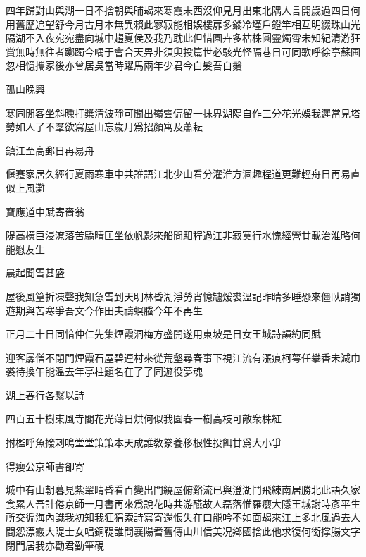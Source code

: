 \documentclass{zhvt-classic-Miya}
\begin{document}
四年歸對山與湖一日不捨朝與晡朅來寒霞未西沒仰見月出東北隅人言開歲過四日何用舊歷追望舒今月古月本無異賴此寥寂能相娛樓扉多鐍冷墐戶鐙竿相互明綴珠山光隔湖不入夜宛宛盡向城中趨夏侯及我乃耽此但惜園卉多枯株圓靈燭霄未知紀清游狂賞無時無往者躑躅今喁于會合天畀非須臾投篇世必駭光怪隔巷日可同歌呼徐亭蘇圃忽相憶攜家後亦曾居吳當時躍馬兩年少君今白髮吾白鬚

\begin{fw}孤山晚興\end{fw}

寒同閒客坐斜曛打槳清波靜可聞出嶺雲偏留一抹界湖隄自作三分花光娛我遲當見塔勢如人了不羣欲寫屋山忘歲月爲招顏寓及蕭耘

\begin{fw}鎮江至高郵日再易舟\end{fw}

偃蹇家居久經行夏雨寒車中共誰語江北少山看分灌淮方涸趣程道更難輕舟日再易直似上風灘

\begin{fw}寶應道中賦寄嗇翁\end{fw}

隄高橫巨浸潦落苦驕晴匡坐依帆影來船問馹程過江非寂寞行水愧經營廿載治淮略何能慰友生

\begin{fw}晨起聞雪甚盛\end{fw}

屋後風篁折凍聲我知急雪到天明林昏湖淨勞宵憶罏煖裘溫記昨晴多睡恐來僵臥誚獨遊期與苦寒爭吾文今作田夫禱螟螣今年不再生

\begin{fw}正月二十日同愔仲仁先集煙霞洞梅方盛開遂用東坡是日女王城詩韻約同賦\end{fw}

迎客孱僧不閉門煙霞石屋碧連村來從荒壑尋春事下視江流有漲痕柯萼任攀香未減巾裘待換午能溫去年亭柱題名在了了同遊役夢魂

\begin{fw}湖上春行各繫以詩\end{fw}

四百五十樹東風寺閣花光薄日烘何似我園春一樹高枝可敵衆株紅

拊檻呼魚撥剌鳴堂堂策策本天成誰敎豢養移根性投餌甘爲大小爭

\begin{fw}得癭公京師書卻寄\end{fw}

城中有山朝暮見紫翠晴昏看百變出門繞屋俯谿流已與澄湖鬥飛練南居勝北此語久家食累人吾計倦京師一月書再來爲說花時共游醼故人磊落惟羅癭大隱王城謝時彥平生所交徧海內識我初知我狂狷索詩寫寄還悵失在口能吟不如面朅來江上多北風過去人間怨漂霰大隄士女唱銅鞮誰問襄陽耆舊傳山川信美况鄕國捨此他求復何衒撑腸文字閉門居我亦勸君勤筆硯
\end{document}
